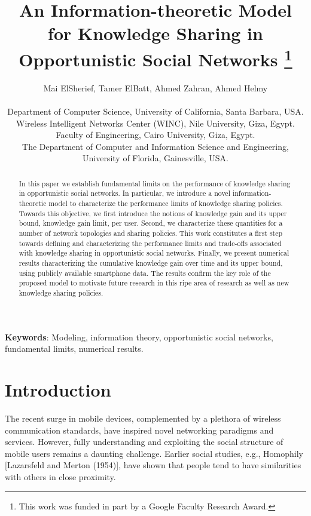 \documentclass[conference]{IEEEtran}
\date{}
\theoremstyle{definition}
\begin{document}
\title{{\fontsize{20}{20}\selectfont An Information-theoretic Model for Knowledge Sharing in Opportunistic Social Networks} \thanks{This work was funded in part by a Google Faculty Research Award.}}

\author{\large Mai ElSherief, Tamer ElBatt, Ahmed Zahran, Ahmed Helmy  \\ [.1in]
\small  \begin{tabular}{c} 
Department of Computer Science, University of California, Santa Barbara, USA.\\
Wireless Intelligent Networks Center (WINC), Nile University, Giza, Egypt.\\
Faculty of Engineering, Cairo University, Giza, Egypt.\\
The Department of Computer and Information Science and Engineering,
University of Florida, Gainesville, USA. \\
\end{tabular} }

\maketitle

\begin{abstract}
In this paper we establish fundamental limits on the performance of knowledge sharing in opportunistic social networks. In particular, we introduce a novel information-theoretic model to characterize the performance limits of knowledge sharing policies. Towards this objective, we first introduce the notions of knowledge gain and its upper bound, knowledge gain limit, per user. Second, we characterize these quantities for a number of network topologies and sharing policies. This work constitutes a first step towards defining and characterizing the performance limits and trade-offs associated with knowledge sharing in opportunistic social networks. Finally, we present numerical results characterizing the cumulative knowledge gain over time and its upper bound, using publicly available smartphone data. The results confirm the key role of the proposed 
model to motivate future research in this ripe area of research as well as new knowledge 
sharing policies.
\end{abstract}
\noindent \textbf{Keywords}: Modeling, information theory, opportunistic social networks, fundamental limits, numerical results.
\IEEEpeerreviewmaketitle
\vspace{-0.2 cm}

\section{Introduction}
The recent surge in mobile devices, complemented by a plethora of wireless 
communication standards, have inspired novel networking paradigms and services.
However, fully understanding and exploiting the social structure of 
mobile users remains a daunting challenge. Earlier
social studies, e.g., Homophily {[}Lazarsfeld and Merton (1954){]},
have shown that people tend to have similarities with others in close
proximity. 
\end{document}
